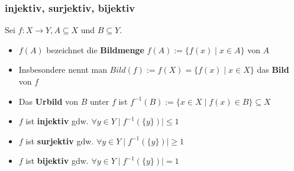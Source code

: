 \documentclass[titlepage]{article}
\newcommand{\1}{\mathbb{1}}
\newcommand{\0}{\mathbb{0}}
\begin{document}
				\subsubsection{injektiv, surjektiv, bijektiv}
					Sei $f:X\rightarrow Y,A\subseteq X$ und $B\subseteq Y$.
					\begin{itemize}
						\item $f(A)$ bezeichnet die \textbf{Bildmenge} $f(A):=\{f(x)\mid x\in A\}$ von $A$
						\item Insbesondere nennt man $Bild(f):=f(X)=\{f(x)\mid x\in X\}$ das \textbf{Bild} von $f$
						\item Das \textbf{Urbild} von $B$ unter $f$ ist $f^{-1}(B):=\{x\in X\mid f(x)\in B\}\subseteq X$
						\item $f$ ist \textbf{injektiv} gdw. $\forall y\in Y\mid f^{-1}(\{y\})\mid\le1$
						\item $f$ ist \textbf{surjektiv} gdw. $\forall y\in Y\mid f^{-1}(\{y\})\mid\ge1$
						\item $f$ ist \textbf{bijektiv} gdw. $\forall y\in Y\mid f^{-1}(\{y\})\mid=1$
					\end{itemize}
\end{document}
